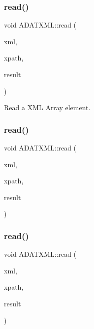 \subsubsection{\texorpdfstring{read()}{read()}\hspace{0.1cm}{\footnotesize\ttfamily [33/52]}}
{\footnotesize\ttfamily void A\+D\+A\+T\+X\+M\+L\+::read (\begin{DoxyParamCaption}\item[{\mbox{\hyperlink{classADATXML_1_1XMLReader}{X\+M\+L\+Reader}} \&}]{xml,  }\item[{const std\+::string \&}]{xpath,  }\item[{std\+::list$<$ int $>$ \&}]{result }\end{DoxyParamCaption})}



Read a X\+ML Array element. 

\mbox{\label{group__io_gab76dffc06569f27474fb03e08b372393}} 
\subsubsection{\texorpdfstring{read()}{read()}\hspace{0.1cm}{\footnotesize\ttfamily [34/52]}}
{\footnotesize\ttfamily void A\+D\+A\+T\+X\+M\+L\+::read (\begin{DoxyParamCaption}\item[{\mbox{\hyperlink{classADATXML_1_1XMLReader}{X\+M\+L\+Reader}} \&}]{xml,  }\item[{const std\+::string \&}]{xpath,  }\item[{std\+::list$<$ unsigned int $>$ \&}]{result }\end{DoxyParamCaption})}

\mbox{\label{group__io_gaf316ff420b43fcc4c23590001af57c66}} 
\subsubsection{\texorpdfstring{read()}{read()}\hspace{0.1cm}{\footnotesize\ttfamily [35/52]}}
{\footnotesize\ttfamily void A\+D\+A\+T\+X\+M\+L\+::read (\begin{DoxyParamCaption}\item[{\mbox{\hyperlink{classADATXML_1_1XMLReader}{X\+M\+L\+Reader}} \&}]{xml,  }\item[{const std\+::string \&}]{xpath,  }\item[{std\+::list$<$ short int $>$ \&}]{result }\end{DoxyParamCaption})}

